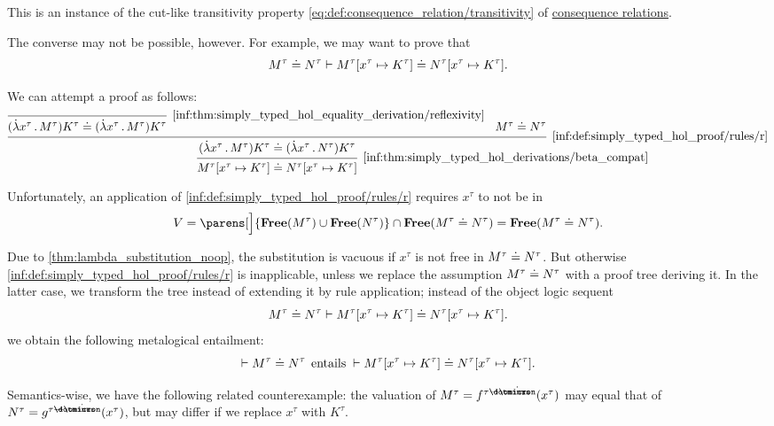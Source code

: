 \begin{remark}
  This is an instance of the cut-like transitivity property \eqref{eq:def:consequence_relation/transitivity} of \hyperref[def:consequence_relation]{consequence relations}.

  The converse may not be possible, however. For example, we may want to prove that
  \begin{equation*}
    M^\tau \doteq N^\tau \vdash M^\tau[x^\tau \mapsto K^\tau] \doteq N^\tau[x^\tau \mapsto K^\tau].
  \end{equation*}

  We can attempt a proof as follows:
  \begin{equation*}
    \begin{prooftree}[separation=0.9em]
      \infer0[\ref{inf:thm:simply_typed_hol_equality_derivation/reflexivity}]{ (\qabs {x^\tau} M^\tau) K^\tau \syneq (\qabs {x^\tau} M^\tau) K^\tau }

      \hypo{ M^\tau \syneq N^\tau }
      \infer2[\ref{inf:def:simply_typed_hol_proof/rules/r}]{ (\qabs {x^\tau} M^\tau) K^\tau \syneq (\qabs {x^\tau} N^\tau) K^\tau }

      \infer1[\ref{inf:thm:simply_typed_hol_derivations/beta_compat}]{ M^\tau[x^\tau \mapsto K^\tau] \syneq N^\tau[x^\tau \mapsto K^\tau] }
    \end{prooftree}
  \end{equation*}

  Unfortunately, an application of \ref{inf:def:simply_typed_hol_proof/rules/r} requires \( x^\tau \) to not be in
  \begin{equation*}
    V = \parens[\Big]{ \op*{Free}(M^\tau) \cup \op*{Free}(N^\tau) } \cap \op*{Free}(M^\tau \syneq N^\tau) = \op*{Free}(M^\tau \syneq N^\tau).
  \end{equation*}

  Due to \cref{thm:lambda_substitution_noop}, the substitution is vacuous if \( x^\tau \) is not free in \( M^\tau \doteq N^\tau \). But otherwise \ref{inf:def:simply_typed_hol_proof/rules/r} is inapplicable, unless we replace the assumption \( M^\tau \doteq N^\tau \) with a proof tree deriving it. In the latter case, we transform the tree instead of extending it by rule application; instead of the object logic sequent
  \begin{equation*}
    M^\tau \doteq N^\tau \vdash M^\tau[x^\tau \mapsto K^\tau] \doteq N^\tau[x^\tau \mapsto K^\tau].
  \end{equation*}
  we obtain the following metalogical entailment:
  \begin{equation*}
    \vdash M^\tau \syneq N^\tau \thinspace \T{entails} {}\vdash M^\tau[x^\tau \mapsto K^\tau] \syneq N^\tau[x^\tau \mapsto K^\tau].
  \end{equation*}

  Semantics-wise, we have the following related counterexample: the valuation of \( M^\tau = f^{\tau \synimplies \syn\omicron}(x^\tau) \) may equal that of \( N^\tau = g^{\tau \synimplies \syn\omicron}(x^\tau) \), but may differ if we replace \( x^\tau \) with \( K^\tau \).
\end{remark}

